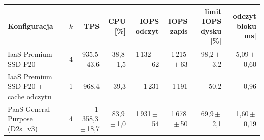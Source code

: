 \begin{tabular}{lrrrrrrr}
\toprule
Konfiguracja & $k$ & TPS & CPU [\%] & IOPS odczyt & IOPS zapis & limit IOPS dysku [\%] & odczyt bloku [ms] \\
\midrule
IaaS Premium SSD P20 & 4 & 935,5\,$\pm$\,43,6 & 38,8\,$\pm$\,1,5 & 1\,132\,$\pm$\,62 & 1\,215\,$\pm$\,63 & 98,2\,$\pm$\,3,2 & 5,09\,$\pm$\,0,60 \\
IaaS Premium SSD P20 + cache odczytu & 1 & 968,4 & 39,3 & 1\,231 & 1\,191 & 50,2 & 0,96 \\
PaaS General Purpose (D2s\_v3) & 4 & 1\,358,3\,$\pm$\,18,7 & 83,9\,$\pm$\,1,0 & 1\,931\,$\pm$\,54 & 1\,678\,$\pm$\,50 & 69,9\,$\pm$\,2,1 & 1,60\,$\pm$\,0,19 \\
\bottomrule
\end{tabular}
